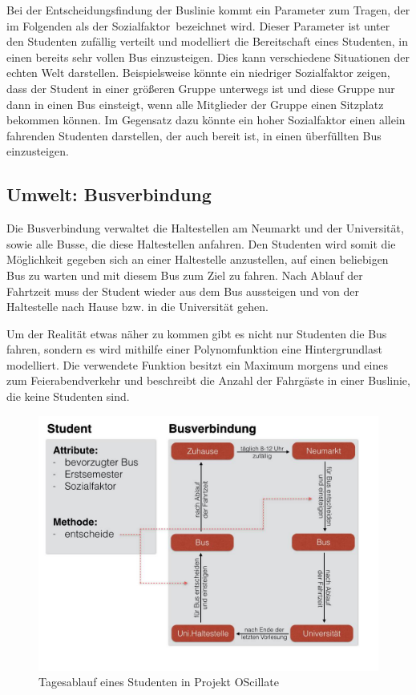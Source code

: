 \documentclass[12pt,a4paper]{scrartcl}
\begin{document}
Bei der Entscheidungsfindung der Buslinie kommt ein Parameter zum Tragen, der im Folgenden als der \glqq Sozialfaktor\grqq~bezeichnet wird. Dieser Parameter ist unter den Studenten zufällig verteilt und modelliert die Bereitschaft eines Studenten, in einen bereits sehr vollen Bus einzusteigen. Dies kann verschiedene Situationen der echten Welt darstellen. Beispielsweise könnte ein niedriger Sozialfaktor zeigen, dass der Student in einer größeren Gruppe unterwegs ist und diese Gruppe nur dann in einen Bus einsteigt, wenn alle Mitglieder der Gruppe einen Sitzplatz bekommen können. Im Gegensatz dazu könnte ein hoher Sozialfaktor  einen allein fahrenden Studenten darstellen, der auch bereit ist, in einen überfüllten Bus einzusteigen.

\subsection{Umwelt: Busverbindung}\label{bus}
Die Busverbindung verwaltet die Haltestellen am Neumarkt und der Universität, sowie alle Busse, die diese Haltestellen anfahren. Den Studenten wird somit die Möglichkeit gegeben sich an einer Haltestelle anzustellen, auf einen beliebigen Bus zu warten und mit diesem Bus zum Ziel zu fahren. Nach Ablauf der Fahrtzeit muss der Student wieder aus dem Bus aussteigen und von der Haltestelle nach Hause bzw. in die Universität gehen. 

Um der Realität etwas näher zu kommen gibt es nicht nur Studenten die Bus fahren, sondern es wird mithilfe einer Polynomfunktion eine \glqq Hintergrundlast\grqq~ modelliert. Die verwendete Funktion besitzt ein Maximum morgens und eines zum Feierabendverkehr und beschreibt die Anzahl der Fahrgäste in einer Buslinie, die keine Studenten sind.

\begin{figure}[ht!]
\includegraphics[scale=0.4]{Ablaufdiagramm.jpg}
\caption{Tagesablauf eines Studenten in Projekt OScillate}
\label{ablauf}
\end{figure}
\end{document}
